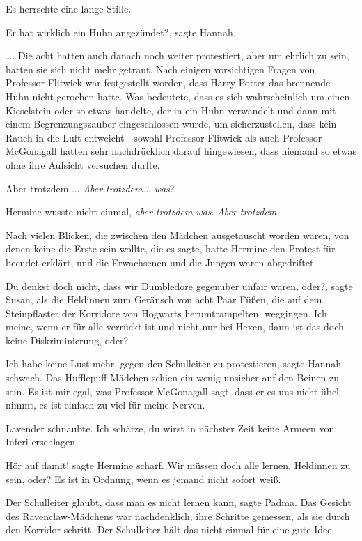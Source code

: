 Es herrschte eine lange Stille.

\glqq{}Er hat wirklich ein Huhn angezündet?\grqq{}, sagte Hannah.

…. Die acht hatten auch danach noch weiter protestiert, aber um ehrlich zu sein,
hatten sie sich nicht mehr getraut. Nach einigen vorsichtigen Fragen von
Professor Flitwick war festgestellt worden, dass Harry Potter das brennende Huhn
nicht gerochen hatte. Was bedeutete, dass es sich wahrscheinlich um einen
Kieselstein oder so etwas handelte, der in ein Huhn verwandelt und dann mit
einem Begrenzungszauber eingeschlossen wurde, um sicherzustellen, dass kein
Rauch in die Luft entweicht - sowohl Professor Flitwick als auch Professor
McGonagall hatten sehr nachdrücklich darauf hingewiesen, dass niemand so etwas
ohne ihre Aufsicht versuchen durfte.

Aber trotzdem ... \emph{Aber trotzdem..}. \emph{was}?

Hermine wusste nicht einmal, \emph{aber trotzdem was}.
\emph{Aber trotzdem.}

Nach vielen Blicken, die zwischen den Mädchen ausgetauscht worden waren, von
denen keine die Erste sein wollte, die es sagte, hatte Hermine den Protest für
beendet erklärt, und die Erwachsenen und die Jungen waren abgedriftet.

\glqq{}Du denkst doch nicht, dass wir Dumbledore gegenüber unfair waren,
oder?\grqq{}, sagte Susan, als die Heldinnen zum Geräusch von acht Paar Füßen,
die auf dem Steinpflaster der Korridore von Hogwarts herumtrampelten, weggingen.
\glqq{}Ich meine, wenn er für alle verrückt ist und nicht nur bei Hexen, dann ist
das doch keine Diskriminierung, oder?\grqq{}

\glqq{}Ich habe keine Lust mehr, gegen den Schulleiter zu protestieren\grqq{},
sagte Hannah schwach. Das Hufflepuff-Mädchen schien ein wenig unsicher auf den
Beinen zu sein. \glqq{}Es ist mir egal, was Professor McGonagall sagt, dass er es
uns nicht übel nimmt, es ist einfach zu viel für meine Nerven.\grqq{}

Lavender schnaubte. \glqq{}Ich schätze, du wirst in nächster Zeit keine Armeen
von Inferi erschlagen -\grqq{}

\glqq{}Hör auf damit!\grqq{} sagte Hermine scharf. \glqq{}Wir müssen doch alle
lernen, Heldinnen zu sein, oder? Es ist in Ordnung, wenn es jemand nicht sofort
weiß.\grqq{}

\glqq{}Der Schulleiter glaubt, dass man es nicht lernen kann\grqq{}, sagte Padma.
Das Gesicht des Ravenclaw-Mädchens war nachdenklich, ihre Schritte gemessen, als
sie durch den Korridor schritt. \glqq{}Der Schulleiter hält das nicht einmal für
eine gute Idee.\grqq{}

